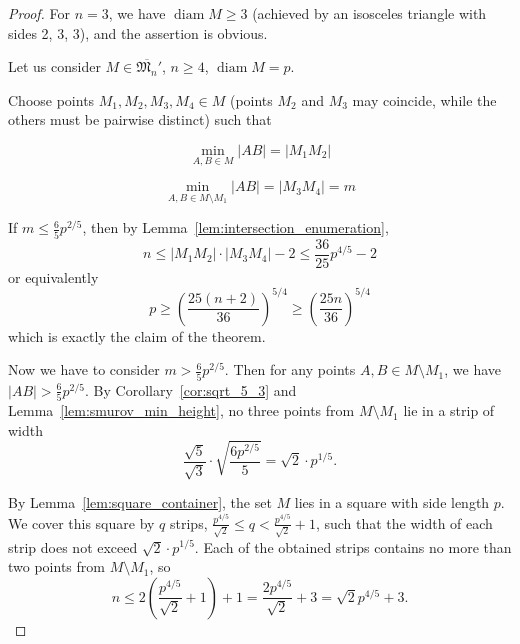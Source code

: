 \documentclass[a4paper,14pt]{article} %
\theoremstyle{plain}
\theoremstyle{definition}
\begin{document}
\begin{proof}
	For $n = 3$, we have $\operatorname{diam} M \geq 3$ (achieved by an isosceles triangle with sides 2, 3, 3), and the assertion is obvious.

	Let us consider $M \in \overline{\mathfrak{M}_n}'$, $n \geq 4$, $\operatorname{diam} M = p$.

	Choose points $M_1, M_2, M_3, M_4 \in M$ (points $M_2$ and $M_3$ may coincide, while the others must be pairwise distinct) such that

	\begin{equation*}
		\min_{A,B \in M} |AB| = |M_1 M_2|
	\end{equation*}

	\begin{equation*}
		\min_{A,B \in M \setminus {M_1}} |AB| = |M_3 M_4| = m
	\end{equation*}

	If $m \leq \frac{6}{5}p^{2/5}$, then by Lemma~\ref{lem:intersection_enumeration},
	\begin{equation*}
		n \leq |M_1 M_2| \cdot |M_3 M_4| - 2 \leq \frac{36}{25}p^{4/5} - 2
	\end{equation*}
	or equivalently
	\begin{equation}
		p \geq \left(\frac{25(n+2)}{36}\right)^{5/4} \geq \left(\frac{25n}{36}\right)^{5/4}
	\end{equation}
	which is exactly the claim of the theorem.

	Now we have to consider $m > \frac{6}{5}p^{2/5}$.
	Then for any points $A, B \in M \setminus {M_1}$, we have $|AB| > \frac{6}{5}p^{2/5}$.
	By Corollary~\ref{cor:sqrt_5_3} and Lemma~\ref{lem:smurov_min_height},
	no three points from $M \setminus {M_1}$ lie in a strip of width
	\begin{equation}
		\frac{\sqrt{5}}{\sqrt{3}} \cdot \sqrt{\frac{6p^{2/5}}{5}} = \sqrt{2} \cdot p^{1/5}
		.
	\end{equation}

	By Lemma~\ref{lem:square_container}, the set $M$ lies in a square with side length $p$. We cover this square by $q$ strips, $\frac{p^{4/5}}{\sqrt{2}} \leq q < \frac{p^{4/5}}{\sqrt{2}} + 1$, such that the width of each strip does not exceed $\sqrt{2} \cdot p^{1/5}$.
	Each of the obtained strips contains no more than two points from $M \setminus {M_1}$, so
	\begin{equation}
		\label{eq: 46}
		n \leq 2 \left( \frac{p^{4/5}}{\sqrt{2}} + 1\right) + 1=\frac{2p^{4/5}}{\sqrt{2}} +3 = \sqrt{2}p^{4/5}+3
		.
	\end{equation}


\end{proof}
\end{document}
